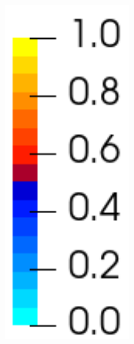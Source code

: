 \begin{figure}[!htb]
\begin{subfigure}[b]{0.1\textwidth}
    \includegraphics[width=0.6\textwidth]{Chapter5/figures/spallation/colorbar_c_seed}
    \vspace{4em}
  \end{subfigure}
  

\end{figure}
